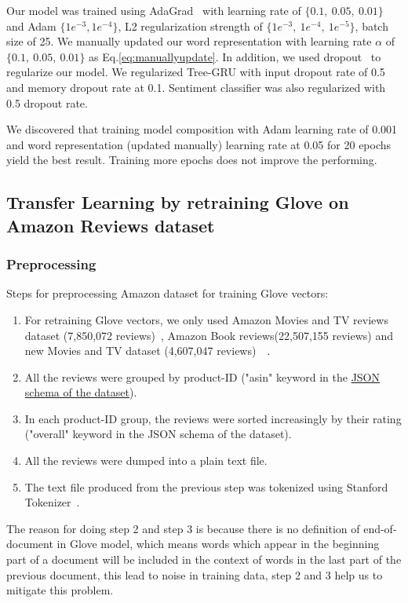 Our model was trained using AdaGrad~\cite{duchi2011adaptive} with learning rate of $\{0.1,~ 0.05,~ 0.01\}$ and Adam $\{1e^{-3}, 1e^{-4}\}$, L2 regularization strength of $\{1e^{-3},~ 1e^{-4}, ~ 1e^{-5} \}$, batch size of 25. We manually updated our word representation with learning rate $\alpha$ of $\{0.1,~0.05, ~0.01\}$ as Eq.\ref{eq:manuallyupdate}. In addition, we used dropout~\cite{krizhevsky2012imagenet} to regularize our model. We regularized Tree-GRU with input dropout rate of 0.5 and memory dropout rate at 0.1. Sentiment classifier was also regularized with 0.5 dropout rate.

We discovered that training model composition with Adam learning rate of 0.001 and word representation (updated manually) learning rate at 0.05 for 20 epochs yield the best result.
Training more epochs does not improve the performing.

\subsection{Transfer Learning by retraining Glove on Amazon Reviews dataset}
\subsubsection{Preprocessing}
Steps for preprocessing Amazon dataset for training Glove vectors:
\begin{enumerate}
\item For retraining Glove vectors, we only used Amazon Movies and TV reviews dataset (7,850,072 reviews)~\cite{mcauley2013hidden}, Amazon Book reviews(22,507,155 reviews) and new Movies and TV dataset (4,607,047 reviews)~\cite{McAuleyTSH15}~\cite{HeM16}.
\item All the reviews were grouped by product-ID ("asin" keyword in the \hyperref[sec:amazon]{JSON schema of the dataset}).
\item In each product-ID group, the reviews were sorted increasingly by their rating ("overall" keyword in the JSON schema of the dataset).
\item All the reviews were dumped into a plain text file.
\item The text file produced from the previous step was tokenized using Stanford Tokenizer~\cite{tokenizerpart}.
\end{enumerate}
The reason for doing step 2 and step 3 is because there is no definition of end-of-document in Glove model, which means words which appear in the beginning part of a document will be included in the context of words in the last part of the previous document, this lead to noise in training data, step 2 and 3 help us to mitigate this problem.


